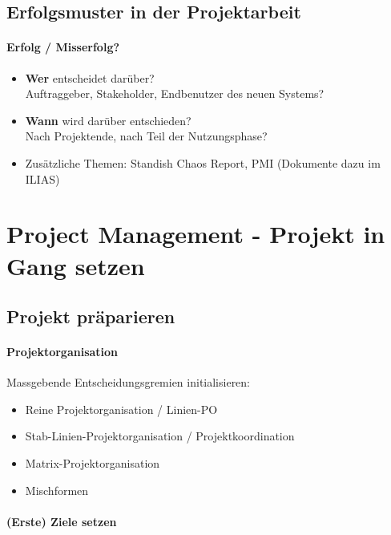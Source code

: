 \documentclass[a4paper]{article}
\begin{document}
	\subsection{Erfolgsmuster in der Projektarbeit}
	
		\paragraph{Erfolg / Misserfolg?}
		
		\begin{itemize}
			\item \textbf{Wer} entscheidet darüber?\\
					Auftraggeber, Stakeholder, Endbenutzer des neuen Systems?
			\item \textbf{Wann} wird darüber entschieden?\\
					Nach Projektende, nach Teil der Nutzungsphase?
			\item Zusätzliche Themen: Standish Chaos Report, PMI (Dokumente dazu im ILIAS)
		\end{itemize}
	
	
\newpage
	
	\section{Project Management - Projekt in Gang setzen}
	
		\subsection{Projekt präparieren}
		
			\paragraph{Projektorganisation}
			
			Massgebende Entscheidungsgremien initialisieren:
				\begin{itemize}
					\item Reine Projektorganisation / Linien-PO
					\item Stab-Linien-Projektorganisation / Projektkoordination
					\item Matrix-Projektorganisation
					\item Mischformen
				\end{itemize}
			
			\paragraph{(Erste) Ziele setzen}
			
\end{document}
